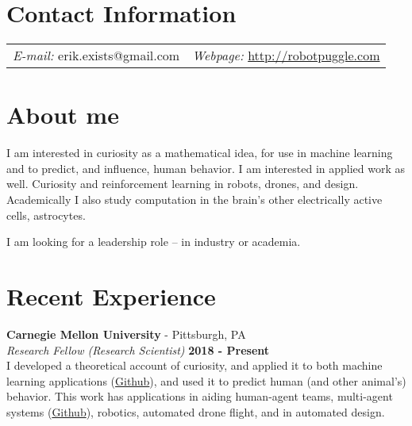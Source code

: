 \documentclass[margin,line]{res}
\begin{document}
\newcommand{\link}[1]{\texttt{#1}}
\providecommand{\tightlist}{%
    \setlength{\itemsep}{0pt}\setlength{\parskip}{0pt}}



\begin{resume}
\section{\sc Contact Information}
\vspace{.05in}

\begin{tabular}{@{}p{2in}p{4in}}
{\it E-mail:}  erik.exists@gmail.com   & {\it Webpage:} \href{http://robotpuggle.com}{http://robotpuggle.com} \\
\end{tabular}

\vspace{-.1cm}
\section{\sc About me}
I am interested in curiosity as a mathematical idea, for use in machine learning and to predict, and influence, human behavior. I am interested in applied work as well. Curiosity and reinforcement learning in robots, drones, and design. Academically I also study computation in the brain’s other electrically active cells, astrocytes. 

\vspace{-.3cm}
I am looking for a leadership role -- in industry or academia.

\section{\sc Recent Experience}
\vspace{-.2cm}
{\bf Carnegie Mellon University} - Pittsburgh, PA \\
{\em Research Fellow (Research Scientist)} \hfill {\bf 2018 - Present}\\
I developed a theoretical account of curiosity, and applied it to both machine learning applications (\href{https://github.com/CoAxLab/infomercial}{Github}), and used it to predict human (and other animal's) behavior. This work has applications in aiding human-agent teams, multi-agent systems (\href{https://github.com/parenthetical-e/parkid}{Github}), robotics, automated drone flight, and in automated design.


\end{resume}
\end{document}
